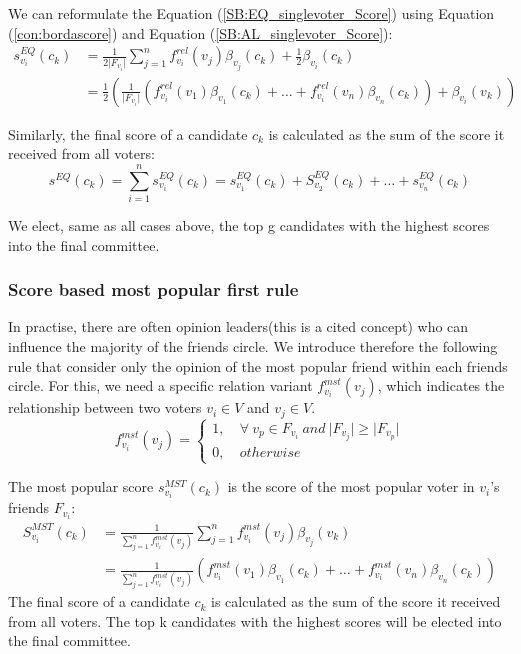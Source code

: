 \documentclass{article}
\begin{document}
We can reformulate the Equation (\ref{SB:EQ_singlevoter_Score}) using Equation (\ref{con:bordascore}) and Equation (\ref{SB:AL_singlevoter_Score}): 
\begin{equation}
\begin{split}
s_{v_i}^{EQ}(c_k) &= \frac{1}{2\vert F_{v_i}\vert}\sum_{j=1}^{n} f_{v_i}^{rel}(v_j)\beta_{v_j}(c_k)+  \frac{1}{2}\beta_{v_i}(c_k) \\
            &= \frac{1}{2}(\frac{1}{\vert F_{v_i}\vert}(f_{v_i}^{rel}(v_1)\beta_{v_1}(c_k) + \dots + f_{v_i}^{rel}(v_n)\beta_{v_n}(c_k)) + \beta_{v_i}(v_k))\label{SB:EQ_singlevoter_Score_reform}\end{split}
\end{equation}

Similarly, the final score of a candidate $c_k$ is calculated as the sum of the score it received from all voters:
\begin{equation}
s^{EQ}(c_k) = \sum_{i=1}^{n} s_{v_i}^{EQ}(c_k)= s_{v_1}^{EQ}(c_k) + S_{v_2}^{EQ}(c_k) + \dots + s_{v_n}^{EQ}(c_k)\label{SB:EQ_aggr_voter_Score}
\end{equation}

We elect, same as all cases above, the top g candidates with the highest scores into the final committee.

\subsubsection{Score based most popular first rule}
In practise, there are often opinion leaders(this is a cited concept) who can influence the majority of the friends circle. We introduce therefore the following rule that consider only the opinion of the most popular friend within each friends circle.
For this, we need a specific relation variant $f_{v_i}^{mst}(v_j)$, which indicates the relationship between two voters $v_i\in V$ and $v_j\in V$. 
 \begin{equation}
 f_{v_i}^{mst}(v_j) =\begin{cases}
        1,\: &\forall  \: v_p \in F_{v_i} \:and  \: \vert F_{v_j} \vert \geqslant 
        \vert F_{v_p} \vert  \\
        0, &otherwise
        \end{cases}\label{re:MST}
\end{equation}

The most popular score $s_{v_i}^{MST}(c_k)$ is the score of the most popular voter in $v_i$'s friends $F_{v_i}$:
\begin{equation}
\begin{split}
S_{v_i}^{MST}(c_k) &= \frac{1}{\sum_{j=1}^{n} f_{v_i}^{mst}(v_j)}\sum_{j=1}^{n} f_{v_i}^{mst}(v_j)\beta_{v_j}(v_k) \\
            &= \frac{1}{\sum_{j=1}^{n} f_{v_i}^{mst}(v_j)}(f_{v_i}^{mst}(v_1)\beta_{v_1}(c_k) + \dots + f_{v_i}^{mst}(v_n)\beta_{v_n}(c_k))\label{SB:MST_singlevoter_Score}
\end{split}
\end{equation}
The final score of a candidate $c_k$ is calculated as the sum of the score it received from all voters. The top k candidates with the highest scores will be elected into the final committee.
\end{document}

